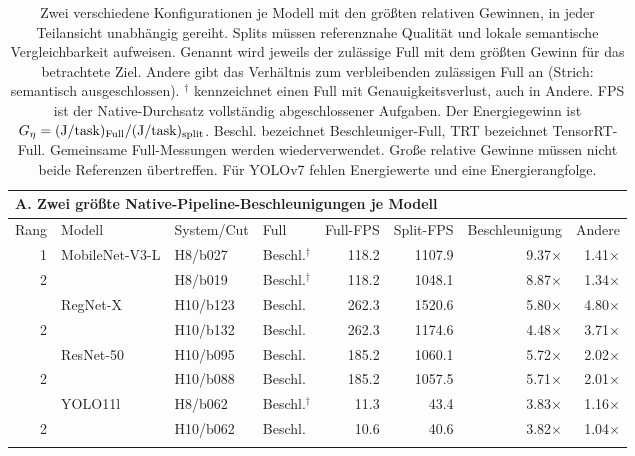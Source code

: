 \begin{table}[!t]
\centering
\caption{Zwei verschiedene Konfigurationen je Modell mit den größten relativen Gewinnen, in jeder Teilansicht unabhängig gereiht. Splits müssen referenznahe Qualität und lokale semantische Vergleichbarkeit aufweisen. Genannt wird jeweils der zulässige Full mit dem größten Gewinn für das betrachtete Ziel. Andere gibt das Verhältnis zum verbleibenden zulässigen Full an (Strich: semantisch ausgeschlossen). $^\dagger$ kennzeichnet einen Full mit Genauigkeitsverlust, auch in Andere. FPS ist der Native-Durchsatz vollständig abgeschlossener Aufgaben. Der Energiegewinn ist $G_\eta=({\rm J/task})_{\rm Full}/({\rm J/task})_{\rm split}$. Beschl. bezeichnet Beschleuniger-Full, TRT bezeichnet TensorRT-Full. Gemeinsame Full-Messungen werden wiederverwendet. Große relative Gewinne müssen nicht beide Referenzen übertreffen. Für YOLOv7 fehlen Energiewerte und eine Energierangfolge.}
\label{tab:best-cases-revision4}
\begingroup
\fontsize{9}{10.4}\selectfont
\setlength{\tabcolsep}{3.5pt}
\renewcommand{\arraystretch}{1.05}
\begin{tabular*}{\textwidth}{@{\extracolsep{\fill}}rlllrrrr@{}}
\toprule
\multicolumn{8}{l}{\textbf{A. Zwei größte Native-Pipeline-Beschleunigungen je Modell}}\\
\midrule
Rang & Modell & System/Cut & Full & Full-FPS & Split-FPS & Beschleunigung & Andere\\
\midrule
1 & MobileNet-V3-L & H8/b027 & Beschl.$^\dagger$ & 118.2 & 1107.9 & 9.37$\times$ & 1.41$\times$\\
2 &  & H8/b019 & Beschl.$^\dagger$ & 118.2 & 1048.1 & 8.87$\times$ & 1.34$\times$\\
\addlinespace[1.3pt]
1 & RegNet-X & H10/b123 & Beschl. & 262.3 & 1520.6 & 5.80$\times$ & 4.80$\times$\\
2 &  & H10/b132 & Beschl. & 262.3 & 1174.6 & 4.48$\times$ & 3.71$\times$\\
\addlinespace[1.3pt]
1 & ResNet-50 & H10/b095 & Beschl. & 185.2 & 1060.1 & 5.72$\times$ & 2.02$\times$\\
2 &  & H10/b088 & Beschl. & 185.2 & 1057.5 & 5.71$\times$ & 2.01$\times$\\
\addlinespace[1.3pt]
1 & YOLO11l & H8/b062 & Beschl.$^\dagger$ & 11.3 & 43.4 & 3.83$\times$ & 1.16$\times$\\
2 &  & H10/b062 & Beschl. & 10.6 & 40.6 & 3.82$\times$ & 1.04$\times$\\
\addlinespace[1.3pt]

\end{tabular*}
\end{table}
